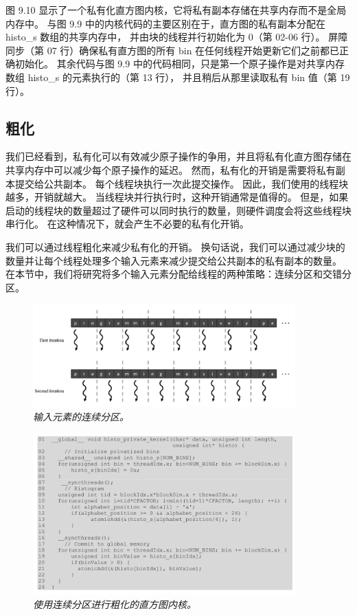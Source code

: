 图 9.10 显示了一个私有化直方图内核，它将私有副本存储在共享内存而不是全局内存中。 
与图 9.9 中的内核代码的主要区别在于，直方图的私有副本分配在 histo\_s 数组的共享内存中，
并由块的线程并行初始化为 0（第 02-06 行）。 
屏障同步（第 07 行）确保私有直方图的所有 bin 在任何线程开始更新它们之前都已正确初始化。 
其余代码与图 9.9 中的代码相同，只是第一个原子操作是对共享内存数组 histo\_s 的元素执行的（第 13 行），
并且稍后从那里读取私有 bin 值（第 19 行）。

\subsection{粗化}
我们已经看到，私有化可以有效减少原子操作的争用，并且将私有化直方图存储在共享内存中可以减少每个原子操作的延迟。 
然而，私有化的开销是需要将私有副本提交给公共副本。 每个线程块执行一次此提交操作。 因此，我们使用的线程块越多，开销就越大。 
当线程块并行执行时，这种开销通常是值得的。 
但是，如果启动的线程块的数量超过了硬件可以同时执行的数量，则硬件调度会将这些线程块串行化。 
在这种情况下，就会产生不必要的私有化开销。

我们可以通过线程粗化来减少私有化的开销。 
换句话说，我们可以通过减少块的数量并让每个线程处理多个输入元素来减少提交给公共副本的私有副本的数量。 
在本节中，我们将研究将多个输入元素分配给线程的两种策略：连续分区和交错分区。

\begin{figure}[H]
	\centering
	\includegraphics[width=0.9\textwidth]{figs/F9.11.png}
	\caption{\textit{输入元素的连续分区。}}
\end{figure}

\begin{figure}[H]
	\centering
	\includegraphics[width=0.9\textwidth]{figs/F9.12.png}
	\caption{\textit{使用连续分区进行粗化的直方图内核。}}
\end{figure}


